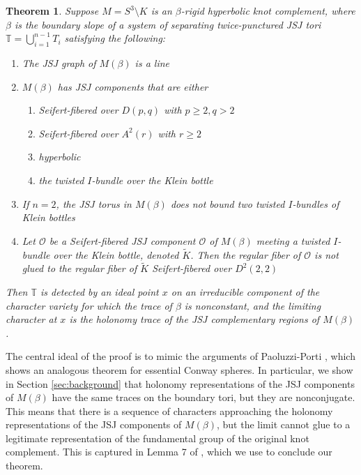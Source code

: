 \documentclass{article}
\theoremstyle{plain}
\newtheorem{theorem}{Theorem}[section]
\theoremstyle{definition}
\theoremstyle{plain}
\theoremstyle{plain}
\theoremstyle{plain}
\theoremstyle{remark}
\theoremstyle{remark}
\theoremstyle{plain}
\theoremstyle{plain}
\begin{document}
\begin{theorem}\label{thm:main}
Suppose $M = S^3 \setminus K$ is an $\beta$-rigid hyperbolic knot complement, where $\beta$ is the boundary slope of a system of separating twice-punctured JSJ tori $\mathbb{T} = \bigcup_{i=1}^{n-1}T_i$ satisfying the following: 
\begin{enumerate}
	\item The JSJ graph of $M(\beta)$ is a line 
	\item $M(\beta)$ has JSJ components that are either 
	\begin{enumerate}
		\item Seifert-fibered over $D(p, q)$ with $p \geq 2, q > 2$
		\item Seifert-fibered over $A^2(r)$ with $r \geq 2$
		\item hyperbolic
		\item the twisted $I$-bundle over the Klein bottle
	\end{enumerate}
	\item If $n = 2$, the JSJ torus in $M(\beta)$ does not bound two twisted $I$-bundles of Klein bottles
	\item Let $\mathcal{O}$ be a Seifert-fibered JSJ component $\mathcal{O}$ of $M(\beta)$ meeting a twisted $I$-bundle over the Klein bottle, denoted $\tilde{K}$. Then the regular fiber of $\mathcal{O}$ is not glued to the regular fiber of $\tilde{K}$ Seifert-fibered over $D^2(2, 2)$
\end{enumerate}
Then $\mathbb{T}$ is detected by an ideal point $x$ on an irreducible component of the character variety for which the trace of $\beta$ is nonconstant, and the limiting character at $x$ is the holonomy trace of the JSJ complementary regions of $M(\beta)$. 
\end{theorem}

The central ideal of the proof is to mimic the arguments of Paoluzzi-Porti \cite{Paoluzzi2010ConwaySA}, which shows an analogous theorem for essential Conway spheres. In particular, we show in Section \ref{sec:background} that holonomy representations of the JSJ components of $M(\beta)$ have the same traces on the boundary tori, but they are nonconjugate. This means that there is a sequence of characters approaching the holonomy representations of the JSJ components of $M(\beta)$, but the limit cannot glue to a legitimate representation of the fundamental group of the original knot complement. This is captured in Lemma 7 of \cite{Paoluzzi2010ConwaySA}, which we use to conclude our theorem. 
\end{document}
